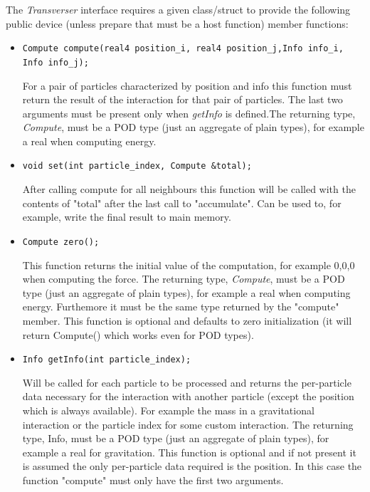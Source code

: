 \documentclass[ twoside,openright,titlepage,numbers=noenddot,%
headinclude,footinclude,cleardoublepage=empty,abstract=on,
BCOR=5mm,paper=a4,fontsize=11pt, dvipsnames
]{scrreprt}
\begin{document}
The \emph{Transverser} interface requires a given class/struct to provide the following public device (unless prepare that must be a host function) member functions:

\begin{itemize}
\item \texttt{Compute compute(real4 position_i, real4 position_j,Info info_i, Info info_j);}

  
  For a pair of particles
  characterized by position and info this function must return the
  result of the interaction for that pair of particles. The last
  two arguments must be present only when \emph{getInfo} is defined.The
  returning type, \emph{Compute}, must be a POD type (just an aggregate of
  plain types), for example a real when computing energy.

\item \texttt{void set(int particle_index, Compute &total);}

  
   After calling compute for all neighbours this function will be called with the contents of "total" after the last call to "accumulate".
   Can be used to, for example, write the final result to main memory.

 \item \texttt{Compute zero();}

   
   This function returns the initial value of the computation, for example {0,0,0} when computing the force. 
   The returning type, \emph{Compute}, must be a POD type (just an aggregate of plain types), for example a real when computing energy. Furthemore it must be the same type returned by the "compute" member.
   This function is optional and defaults to zero initialization (it will return Compute() which works even for POD types).
    
 \item \texttt{Info getInfo(int particle_index);}

   
   Will be called for each particle to be processed and returns the per-particle data necessary for the interaction with another particle (except the position which is always available). For example the mass in a gravitational interaction or the particle index for some custom interaction.
   The returning type, Info, must be a POD type (just an aggregate of plain types), for example a real for gravitation.
   This function is optional and if not present it is assumed the only per-particle data required is the position. 
   In this case the function "compute" must only have the first two arguments.


\end{itemize}
\end{document}
